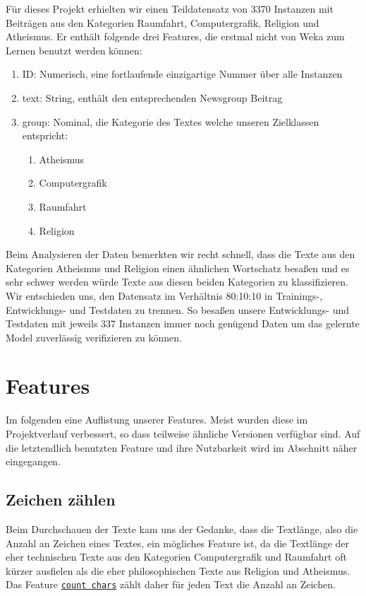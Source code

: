 \documentclass[
	11pt,
	a4paper
]{scrartcl}
\newcommand{\code}[1]{\texttt{\ul{#1}}}
\begin{document}
Für dieses Projekt erhielten wir einen Teildatensatz von 3370 Instanzen mit Beiträgen aus den Kategorien Raumfahrt,
Computergrafik, Religion und Atheismus. Er enthält folgende drei Features, die erstmal nicht von Weka zum
Lernen benutzt werden können:
\begin{enumerate}[label=\roman*), itemsep=0pt,parsep=0pt, topsep=0pt]
	\item ID: Numerisch, eine fortlaufende einzigartige Nummer über alle Instanzen
	\item text: String, enthält den entsprechenden Newsgroup Beitrag
	\item group: Nominal, die Kategorie des Textes welche unseren Zielklassen entspricht:
	\begin{enumerate}[label=\arabic*., itemsep=0pt,parsep=0pt, topsep=0pt, start=0]
		\item Atheismus
		\item Computergrafik
		\item Raumfahrt
		\item Religion
	\end{enumerate}
\end{enumerate}

Beim Analysieren der Daten bemerkten wir recht schnell, dass die Texte aus den Kategorien Atheismus und 
Religion einen ähnlichen Wortschatz besaßen und es sehr schwer werden würde Texte aus diesen beiden Kategorien zu 
klassifizieren.\\

Wir entschieden uns, den Datensatz im Verhältnis 80:10:10 in Trainings-, Entwicklungs- und Testdaten zu trennen. So besaßen
unsere Entwicklungs- und Testdaten mit jeweils 337 Instanzen immer noch genügend Daten um das gelernte Model zuverlässig 
verifizieren zu können.

\section{Features}
Im folgenden eine Auflistung unserer Features. Meist wurden diese im Projektverlauf verbessert, so dass teilweise ähnliche
Versionen verfügbar sind. Auf die letztendlich benutzten Feature und ihre Nutzbarkeit wird im Abschnitt \emph{}
näher eingegangen.

\subsection{Zeichen zählen}\label{zeichenzaehlen}
Beim Durchschauen der Texte kam uns der Gedanke, dass die Textlänge, also die Anzahl an Zeichen eines Textes, ein mögliches Feature
ist, da die Textlänge der eher technischen Texte aus den Kategorien Computergrafik und Raumfahrt oft kürzer ausfielen als die eher
philosophischen Texte aus Religion und Atheismus.\\
Das Feature \code{count chars} zählt daher für jeden Text die Anzahl an Zeichen.\\
\end{document}
